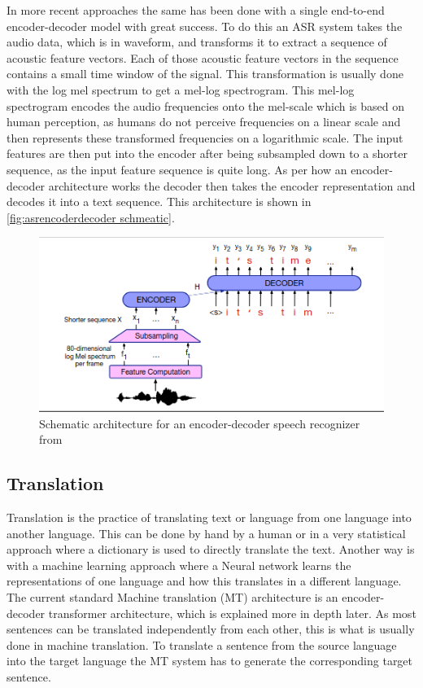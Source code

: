 In more recent approaches the same has been done with a single end-to-end encoder-decoder model with great success. 
To do this an ASR system takes the audio data, which is in waveform, and transforms it to extract a sequence of acoustic feature vectors. 
Each of those acoustic feature vectors in the sequence contains a small time window of the signal. 
This transformation is usually done with the log mel spectrum to get a mel-log spectrogram. \cite[chapter~16]{jm3}
This mel-log spectrogram encodes the audio frequencies onto the mel-scale which is based on human perception, as humans do not perceive frequencies on a linear scale \cite{mellogscale} and then represents these transformed frequencies on a logarithmic scale. 
The input features are then put into the encoder after being subsampled down to a shorter sequence, as the input feature sequence is quite long. 
As per how an encoder-decoder architecture works the decoder then takes the encoder representation and decodes it into a text sequence. 
This architecture is shown in \autoref{fig:asrencoderdecoder schmeatic}.
\begin{figure}[ht]
    \centering
    \includegraphics[width=\linewidth]{Latex//sections//images/asrencoderdecoder.png}
    \caption{Schematic architecture for an encoder-decoder speech recognizer from \cite{jm3}}
    \label{fig:asrencoderdecoder schmeatic}
\end{figure}


\subsection{Translation}
Translation is the practice of translating text or language from one language into another language. 
This can be done by hand by a human or in a very statistical approach where a dictionary is used to directly translate the text. 
Another way is with a machine learning approach where a Neural network learns the representations of one language and how this translates in a different language. 
The current standard Machine translation (MT) architecture is an encoder-decoder transformer architecture, which is explained more in depth later. 
As most sentences can be translated independently from each other, this is what is usually done in machine translation. To translate a sentence from the source language into the target language the MT system has to generate the corresponding target sentence. \cite[chapter~13.2]{jm3}

